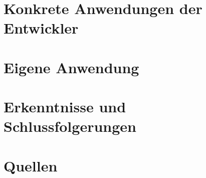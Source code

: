    
    \section{Konkrete Anwendungen der Entwickler}
    
    \section{Eigene Anwendung}
    
    \section{Erkenntnisse und Schlussfolgerungen}
    
    \section{Quellen}
    
    
    
    


